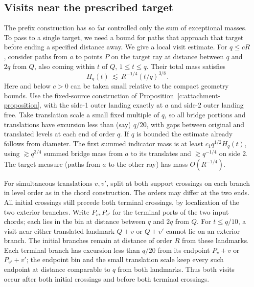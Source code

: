 \subsection{Visits near the prescribed target}\label{c:tilted-visits}
The prefix construction has so far controlled only the sum of exceptional
masses. To pass to a single target, we need a bound for paths that approach
that target before ending a specified distance away. We give a local visit estimate. For \(q\le cR\), consider paths from \(a\) to points \(P\) on the target ray at distance between \(q\) and \(2q\) from \(Q\), also coming within \(t\) of \(Q\), \(1\le t\le q\). Their total mass satisfies
\begin{equation}\label{c:tilted-visit-bound}
 H_q(t)\ \lesssim\ R^{-1/4}(t/q)^{3/8}.
\end{equation}
Here and below \(c>0\) can be taken small relative to the compact geometry bounds. Use the fixed-source construction of Proposition~\ref{c:attachment-proposition}, with the side-1 outer landing exactly at \(a\) and side-2 outer landing free. Take translation scale a small fixed multiple of \(q\), so all bridge portions and translations have excursion less than (say) \(q/20\), with gaps between original and translated levels at each end of order \(q\). If \(q\) is bounded the estimate already follows from diameter. The first summed indicator mass is at least \(c_1 q^{1/2}H_q(t)\), using \(\gtrsim q^{3/4}\) summed bridge mass from \(a\) to its translates and \(\gtrsim q^{-1/4}\) on side 2. The target measure (paths from \(a\) to the other ray) has mass \(O(R^{-1/4})\).



For simultaneous translations \(v,v'\), split at both support crossings
on each branch in level order as in the chord construction. The orders
may differ at the two ends. All initial crossings still precede both
terminal crossings, by localization of the two exterior branches.
Write \(P_v,P_{v'}\) for the terminal ports of the two input chords;
each lies in the bin at distance between \(q\) and \(2q\) from \(Q\).
For \(t\le q/10\), a visit near either translated landmark \(Q+v\) or
\(Q+v'\) cannot lie on an exterior branch. The initial branches remain
at distance of order \(R\) from these landmarks. Each terminal branch
has excursion less than \(q/20\) from its endpoint \(P_v+v\) or
\(P_{v'}+v'\);
the endpoint bin and the small translation scale keep every such
endpoint at distance comparable to \(q\) from both landmarks.
Thus both visits occur after both initial crossings and before both
terminal crossings.

